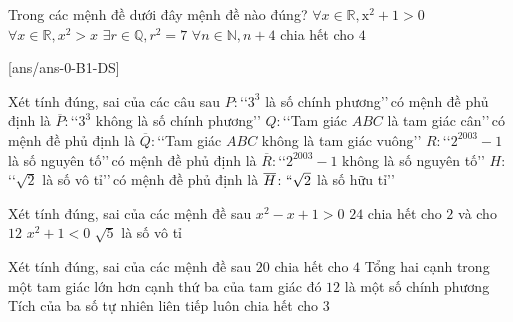  \begin{ex}%
 	Trong các mệnh đề dưới đây mệnh đề nào đúng?
 	\choice
 	{\True $\forall x \in \mathbb{R}, \mathrm{x}^2+1>0$}
 	{$\forall x \in \mathbb{R}, x^2>x$}
 	{$\exists r \in \mathbb{Q}, r^2=7$}
 	{$\forall n \in \mathbb{N}, n+4$ chia hết cho $4$}
 \end{ex}
 \cauds
 [ans/ans-0-B1-DS]
 \begin{ex}%
 	Xét tính đúng, sai của các câu sau
 	\choiceTF
 	{\True $P \colon$\lq\lq$3^3$ là số chính phương\rq\rq \,có mệnh đề phủ định là $\overline{P} \colon$\lq\lq$3^{3}$ không là số chính phương\rq\rq}
 	{$Q \colon$\lq\lq Tam giác $A B C$ là tam giác cân\rq\rq\,có mệnh đề phủ định là $\overline{Q}\colon$\lq\lq Tam giác $A B C$ không là tam giác vuông\rq\rq}
 	{\True $R \colon$\lq\lq $2^{2003}-1$ là số nguyên tố\rq\rq\,có mệnh đề phủ định là $\overline{R}\colon$\lq\lq $2^{2003}-1$ không là số nguyên tố\rq\rq}
 	{$H \colon$\lq\lq $\sqrt{2}$ là số vô tỉ\rq\rq \,có mệnh đề phủ định là $\overline{H}\colon\lq\lq \sqrt{2}$ là số hữu tỉ\rq\rq}
 \end{ex}
 
 \begin{ex}%
 	Xét tính đúng, sai của các mệnh đề sau
 	\choiceTF
 	{\True $x^{2}-x+1>0$}
 	{\True $24$ chia hết cho $2$ và cho $12$}
 	{$x^{2}+1<0$}
 	{\True $\sqrt{5}$ là số vô tỉ}
 \end{ex}
 
 \begin{ex}%
 	Xét tính đúng, sai của các mệnh đề sau
 	\choiceTF
 	{\True $20$ chia hết cho $4$}
 	{\True Tổng hai cạnh trong một tam giác lớn hơn cạnh thứ ba của tam giác đó}
 	{$12$ là một số chính phương}
 	{\True Tích của ba số tự nhiên liên tiếp luôn chia hết cho $3$}
 \end{ex}
 
